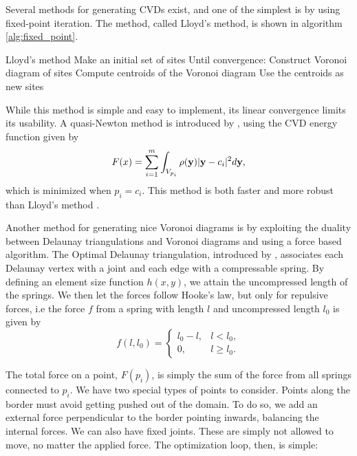 Several methods for generating CVDs exist, and one of the simplest is by using fixed-point iteration. The method, called Lloyd's method, is shown in algorithm \ref{alg:fixed_point}.

\begin{pseudocode}[label=alg:fixed_point]{Lloyd's method}
    Make an initial set of sites
    Until convergence:
        Construct Voronoi diagram of sites
        Compute centroids of the Voronoi diagram
        Use the centroids as new sites
\end{pseudocode}

While this method is simple and easy to implement, its linear convergence limits its usability. A quasi-Newton method is introduced by \textcite{CVDmethods}, using the CVD energy function given by
\begin{equation}
    F(x) = \sum_{i=1}^m \int_{V_{p_i}} \rho(\mathbf{y}) \lvert\mathbf{y} - c_i\rvert^2 d\mathbf{y},
\end{equation}
which is minimized when $p_i = c_i$. This method is both faster and more robust than Lloyd's method \cite{CVDmethods}.

Another method for generating nice Voronoi diagrams is by exploiting the duality between Delaunay triangulations and Voronoi diagrams and using a force based algorithm. The Optimal Delaunay triangulation, introduced by \textcite{Delaunay_force_optimizing}, associates each Delaunay vertex with a joint and each edge with a compressable spring. By defining an element size function $h(x, y)$, we attain the uncompressed length of the springs. We then let the forces follow Hooke's law, but only for repulsive forces, i.e the force $f$ from a spring with length $l$ and uncompressed length $l_0$ is given by
\begin{equation}
    \label{eq:delaunay_force}
    f(l, l_0) = \begin{cases}
        l_0 - l, & l < l_0, \\
        0, & l \ge l_0.
    \end{cases}
\end{equation}

The total force on a point, $F(p_i)$, is simply the sum of the force from all springs connected to $p_i$. We have two special types of points to consider. Points along the border must avoid getting pushed out of the domain. To do so, we add an external force perpendicular to the border pointing inwards, balancing the internal forces. We can also have fixed joints. These are simply not allowed to move, no matter the applied force. The optimization loop, then, is simple:

